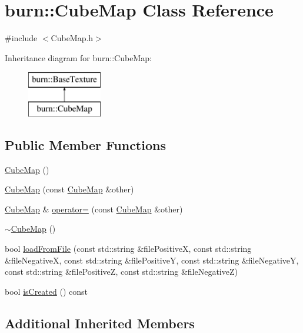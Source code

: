 \hypertarget{classburn_1_1_cube_map}{\section{burn\-:\-:Cube\-Map Class Reference}
\label{classburn_1_1_cube_map}
}


{\ttfamily \#include $<$Cube\-Map.\-h$>$}

Inheritance diagram for burn\-:\-:Cube\-Map\-:\begin{figure}[H]
\begin{center}
\leavevmode
\includegraphics[height=2.000000cm]{classburn_1_1_cube_map}
\end{center}
\end{figure}
\subsection*{Public Member Functions}
\begin{DoxyCompactItemize}
\item 
\hyperlink{classburn_1_1_cube_map_ad939f4da21b13dc151b40fc00f0c9190}{Cube\-Map} ()
\item 
\hyperlink{classburn_1_1_cube_map_a598b2f65a23c9e5f6953674e4ecf0ef2}{Cube\-Map} (const \hyperlink{classburn_1_1_cube_map}{Cube\-Map} \&other)
\item 
\hyperlink{classburn_1_1_cube_map}{Cube\-Map} \& \hyperlink{classburn_1_1_cube_map_a8d69eda5fbff34f7546fe4c5b492cb5e}{operator=} (const \hyperlink{classburn_1_1_cube_map}{Cube\-Map} \&other)
\item 
\hyperlink{classburn_1_1_cube_map_a2e4355a56bbfd2ce2e3ee7b8dbff3dee}{$\sim$\-Cube\-Map} ()
\item 
bool \hyperlink{classburn_1_1_cube_map_aadf42f29ffdb3ae94cda581f55ac6f72}{load\-From\-File} (const std\-::string \&file\-Positive\-X, const std\-::string \&file\-Negative\-X, const std\-::string \&file\-Positive\-Y, const std\-::string \&file\-Negative\-Y, const std\-::string \&file\-Positive\-Z, const std\-::string \&file\-Negative\-Z)
\item 
bool \hyperlink{classburn_1_1_cube_map_a34570ba1966f5267f074a5e967bdefaa}{is\-Created} () const 
\end{DoxyCompactItemize}
\subsection*{Additional Inherited Members}



